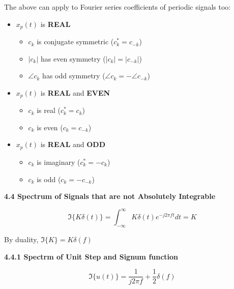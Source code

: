 \documentclass[landscape,a4paper]{extarticle}
\newenvironment{Figure}
  {\noindent\minipage{\linewidth}}
  {\endminipage\par\medskip}
\begin{document}
\begin{multicols*}{5}
    The above can apply to Fourier series coefficients of periodic signals too:
    \begin{itemize}
        \item $x_p(t)$ is \textbf{REAL}
        \begin{itemize}
            \item $c_k$ is conjugate symmetric \textcolor{black!70}{($c_k^* = c_{-k}$)}
            \item $|c_k|$ has even symmetry \textcolor{black!70}{($|c_k|=|c_{-k}|$)}
            \item $\angle c_k$ has odd symmetry \textcolor{black!70}{($\angle c_k = -\angle c_{-k}$)}
        \end{itemize}
        \item $x_p(t)$ is \textbf{REAL} and \textbf{EVEN}
        \begin{itemize}
            \item $c_k$ is real \textcolor{black!70}{($c_k^*=c_k$)}
            \item $c_k$ is even \textcolor{black!70}{($c_k=c_{-k}$)}
        \end{itemize}
        \item $x_p(t)$ is \textbf{REAL} and \textbf{ODD}
        \begin{itemize}
            \item $c_k$ is imaginary \textcolor{black!70}{($c_k^*=-c_k$)}
            \item $c_k$ is odd \textcolor{black!70}{($c_k=-c_{-k}$)}
        \end{itemize}
    \end{itemize}
    \textbf{4.4 Spectrum of Signals that are not Absolutely Integrable}

    \[
        \Im\{K\delta (t)\} = \int_{-\infty}^{\infty}K \delta(t)e^{-j2\pi  ft}dt=K \tag{4.13}
    \]

    By duality, $\Im\{K\}=K\delta(f)$

    \textbf{4.4.1 Spectrm of Unit Step and Signum function}

    \[
        \Im\{u(t)\}=\frac{1}{j2\pi f} + \frac{1}{2}\delta(f)
    \]


\end{multicols*}
\end{document}
